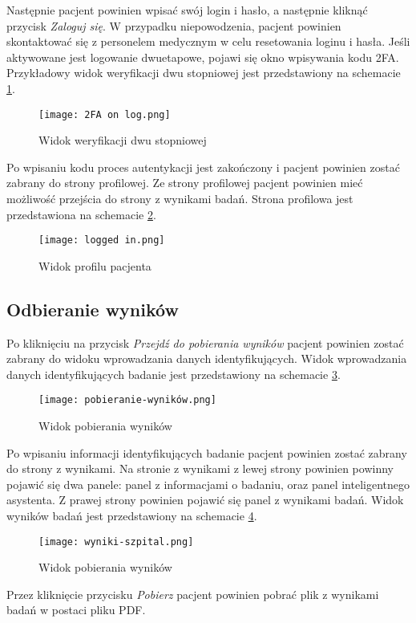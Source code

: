 \documentclass{documentation}
\begin{document}
Następnie pacjent powinien wpisać swój login i hasło, a następnie kliknąć przycisk \textit{Zaloguj się}.
W przypadku niepowodzenia, pacjent powinien skontaktować się z personelem medycznym w celu resetowania loginu i hasła.
Jeśli aktywowane jest logowanie dwuetapowe, pojawi się okno wpisywania kodu 2FA.
Przykładowy widok weryfikacji dwu stopniowej jest przedstawiony na schemacie \ref{fig:2FA}.

\begin{figure}[h]
    \centering
    \texttt{[image: 2FA on log.png]}
    \caption{Widok weryfikacji dwu stopniowej\label{fig:2FA}}
\end{figure}

Po wpisaniu kodu proces autentykacji jest zakończony i pacjent powinien zostać zabrany do strony profilowej.
Ze strony profilowej pacjent powinien mieć możliwość przejścia do strony z wynikami badań.
Strona profilowa jest przedstawiona na schemacie \ref{fig:patientProfile}.

\begin{figure}[h]
    \centering
    \texttt{[image: logged in.png]}
    \caption{Widok profilu pacjenta\label{fig:patientProfile}}
\end{figure}

\subsection{Odbieranie wyników}

Po kliknięciu na przycisk \textit{Przejdź do pobierania wyników} pacjent powinien zostać zabrany do widoku wprowadzania danych identyfikujących.
Widok wprowadzania danych identyfikujących badanie jest przedstawiony na schemacie \ref{fig:patientData}.

\begin{figure}[h]
    \centering
    \texttt{[image: pobieranie-wyników.png]}
    \caption{Widok pobierania wyników\label{fig:patientData}}
\end{figure}

Po wpisaniu informacji identyfikujących badanie pacjent powinien zostać zabrany do strony z wynikami.
Na stronie z wynikami z lewej strony powinien powinny pojawić się dwa panele: panel z informacjami o badaniu, oraz panel inteligentnego asystenta.
Z prawej strony powinien pojawić się panel z wynikami badań.
Widok wyników badań jest przedstawiony na schemacie \ref{fig:results}.

\begin{figure}[h]
    \centering
    \texttt{[image: wyniki-szpital.png]}
    \caption{Widok pobierania wyników\label{fig:results}}
\end{figure}

Przez kliknięcie przycisku \textit{Pobierz} pacjent powinien pobrać plik z wynikami badań w postaci pliku PDF.

\end{document}
